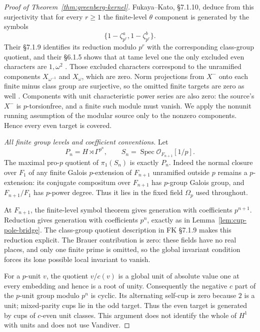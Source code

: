 \documentclass[11pt,a4paper]{article}
\theoremstyle{definition}
\begin{document}
\begin{proof}[Proof of Theorem~\ref{thm:greenberg-kernel}]
Fukaya--Kato, \S7.1.10, deduce from this surjectivity that for every
$r\ge1$ the finite-level $\theta$ component is generated by the
symbols
\[
 \{1-\zeta_{p^r}^{a},1-\zeta_{p^r}^{b}\}.
\]
Their \S7.1.9 identifies its reduction modulo $p^r$ with the
corresponding class-group quotient, and their \S6.1.5 shows that
at tame level one the only excluded even characters are
$1,\omega^2$
\cite[\S6.1.5, p.~76; \S\S7.1.8--7.1.10,
p.~86]{FukayaKato2012}.
Those excluded characters correspond to the unramified components
$X_{\omega^{-1}}$ and $X_\omega$, which are zero. Norm projections
from $X^-$ onto each finite minus class group are surjective, so
the omitted finite targets are zero as well
\cite[Proposition~3.4.1 and proof,
pp.~90--91]{SharifiIwasawaNotes}.
Components with unit characteristic power series are also zero:
the source's $X^-$ is $p$-torsionfree, and a finite such module must
vanish. We apply the nonunit running assumption of the modular
source only to the nonzero components. Hence every even target is
covered.

\emph{All finite group levels and coefficient conventions.}
Let
\[
 P_n=H\rtimes\Gamma^{p^n},\qquad
 S_n=\operatorname{Spec}\mathcal O_{F_{n+1}}[1/p].
\]
The maximal pro-$p$ quotient of $\pi_1(S_n)$ is exactly $P_n$.
Indeed the normal closure over $F_1$ of any finite Galois
$p$-extension of $F_{n+1}$ unramified outside $p$ remains a
$p$-extension: its conjugate compositum over $F_{n+1}$ has
$p$-group Galois group, and $F_{n+1}/F_1$ has $p$-power degree.
Thus it lies in the fixed field $\Omega_p$ used throughout.

At $F_{n+1}$, the finite-level symbol theorem gives generation
with coefficients $p^{n+1}$. Reduction gives generation with
coefficients $p^n$, exactly as in Lemma~\ref{lem:cup-pole-bridge}.
The class-group quotient description in FK \S7.1.9 makes this
reduction explicit. The Brauer contribution is zero: these fields
have no real places, and only one finite prime is omitted, so the
global invariant condition forces its lone possible local
invariant to vanish.

For a $p$-unit $v$, the quotient $v/c(v)$ is a global unit of
absolute value one at every embedding and hence is a root of
unity. Consequently the negative $c$ part of the $p$-unit group
modulo $p^n$ is cyclic. Its alternating self-cup is zero because
$2$ is a unit; mixed-parity cups lie in the odd target. Thus the
even target is generated by cups of $c$-even unit classes. This
argument does not identify the whole of $H^1$ with units and does
not use Vandiver.


\end{proof}
\end{document}
